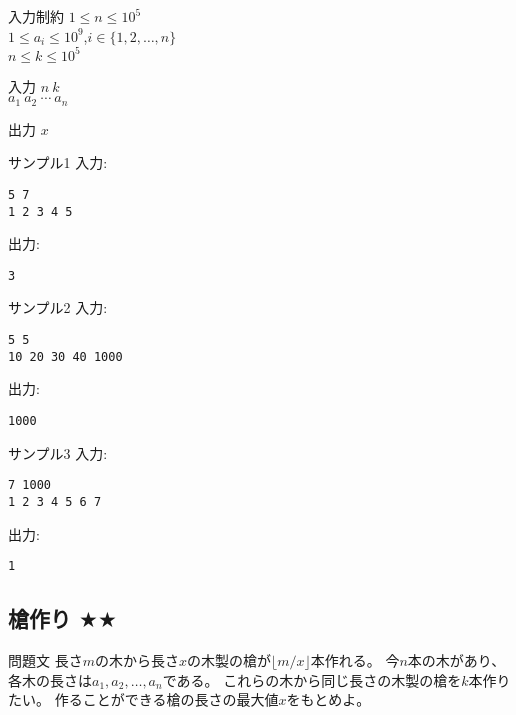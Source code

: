 \documentclass[a4paper,twoside,onecolumn,openany,article,10pt]{memoir}
\theoremstyle{remark}
\begin{document}
\begin{itembox}[l]{入力制約}
$1\le n\le 10^5$\\
$1\le a_i\le 10^9$,\hspace{2em}$i\in\{1,2,\dotsc,n\}$\\
$n\le k\le 10^5$
\end{itembox}

\begin{itembox}[l]{入力}
$n~k$\\
$a_1~a_2~\dotsb~a_n$
\end{itembox}

\begin{itembox}[l]{出力}
$x$
\end{itembox}

\begin{itembox}[l]{サンプル1}
入力:
\begin{verbatim}
5 7
1 2 3 4 5
\end{verbatim}
出力:
\begin{verbatim}
3
\end{verbatim}
\end{itembox}

\begin{itembox}[l]{サンプル2}
入力:
\begin{verbatim}
5 5
10 20 30 40 1000
\end{verbatim}
出力:
\begin{verbatim}
1000
\end{verbatim}
\end{itembox}

\begin{itembox}[l]{サンプル3}
入力:
\begin{verbatim}
7 1000
1 2 3 4 5 6 7
\end{verbatim}
出力:
\begin{verbatim}
1
\end{verbatim}
\end{itembox}


\clearpage
\subsection{槍作り $\bigstar\bigstar$}
\begin{itembox}[l]{問題文}
長さ$m$の木から長さ$x$の木製の槍が$\lfloor m/x\rfloor$本作れる。
今$n$本の木があり、各木の長さは$a_1,a_2,\dotsc,a_n$である。
これらの木から同じ長さの木製の槍を$k$本作りたい。
作ることができる槍の長さの最大値$x$をもとめよ。
\end{itembox}
\end{document}
